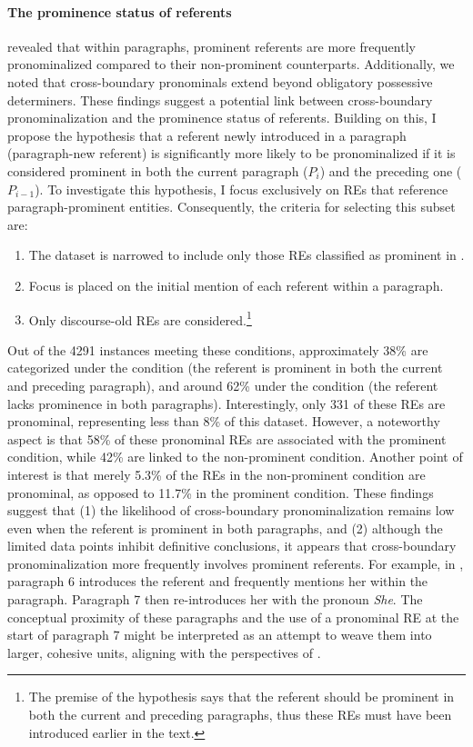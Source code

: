 \paragraph*{The prominence status of referents}

 revealed that within paragraphs, prominent referents are more frequently pronominalized compared to their non-prominent counterparts. Additionally, we noted that cross-boundary pronominals extend beyond obligatory possessive determiners. These findings suggest a potential link between cross-boundary pronominalization and the prominence status of referents. Building on this, I propose the hypothesis that a referent newly introduced in a paragraph (paragraph-new referent) is significantly more likely to be pronominalized if it is considered prominent in both the current paragraph ($P_{i}$) and the preceding one ($P_{i-1}$). To investigate this hypothesis, I focus exclusively on REs that reference paragraph-prominent entities. Consequently, the criteria for selecting this subset are:



\begin{enumerate}
	\item The dataset is narrowed to include only those REs classified as prominent in .
	\item Focus is placed on the initial mention of each referent within a paragraph.
	\item Only discourse-old REs are considered.\footnote{The premise of the hypothesis says that the referent should be prominent in both the current and preceding paragraphs, thus these REs must have been introduced earlier in the text.}
\end{enumerate}


Out of the 4291 instances meeting these conditions, approximately 38\% are categorized under the  condition (the referent is prominent in both the current and preceding paragraph), and around 62\% under the  condition (the referent lacks prominence in both paragraphs). Interestingly, only 331 of these REs are pronominal, representing less than 8\% of this dataset. However, a noteworthy aspect is that 58\% of these pronominal REs are associated with the prominent condition, while 42\% are linked to the non-prominent condition. Another point of interest is that merely 5.3\% of the REs in the non-prominent condition are pronominal, as opposed to 11.7\% in the prominent condition. These findings suggest that (1) the likelihood of cross-boundary pronominalization remains low even when the referent is prominent in both paragraphs, and (2) although the limited data points inhibit definitive conclusions, it appears that cross-boundary pronominalization more frequently involves prominent referents. For example, in , paragraph 6 introduces the referent  and frequently mentions her within the paragraph. Paragraph 7 then re-introduces her with the pronoun \textit{She}. The conceptual proximity of these paragraphs and the use of a pronominal RE at the start of paragraph 7 might be interpreted as an attempt to weave them into larger, cohesive units, aligning with the perspectives of \citet{Hofmann1989}.

